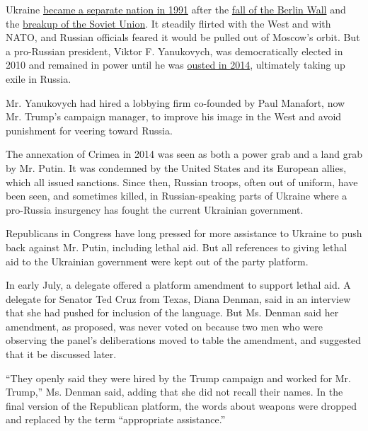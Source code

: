 Ukraine
\href{http://www.nytimes.com/1991/12/03/world/ex-communist-wins-in-ukraine-yeltsin-recognizes-independence.html}{became
a separate nation in 1991} after the
\href{http://www.nytimes.com/1989/11/10/world/clamor-east-east-germany-opens-frontier-west-for-migration-travel-thousands.html}{fall
of the Berlin Wall} and the
\href{http://www.nytimes.com/1991/12/24/world/end-of-the-soviet-union-yeltsin-asks-bush-to-grant-russians-recognition-by-us.html}{breakup
of the Soviet Union}. It steadily flirted with the West and with NATO,
and Russian officials feared it would be pulled out of Moscow's orbit.
But a pro-Russian president, Viktor F. Yanukovych, was democratically
elected in 2010 and remained in power until he was
\href{http://www.nytimes.com/2014/02/23/world/europe/with\%2Dpresidents\%2Ddeparture\%2Dukraine\%2Dlooks\%2Dtoward\%2Da\%2Dmurky\%2Dfuture.html}{ousted
in 2014}, ultimately taking up exile in Russia.

Mr. Yanukovych had hired a lobbying firm co-founded by Paul Manafort,
now Mr. Trump's campaign manager, to improve his image in the West and
avoid punishment for veering toward Russia.

The annexation of Crimea in 2014 was seen as both a power grab and a
land grab by Mr. Putin. It was condemned by the United States and its
European allies, which all issued sanctions. Since then, Russian troops,
often out of uniform, have been seen, and sometimes killed, in
Russian-speaking parts of Ukraine where a pro-Russia insurgency has
fought the current Ukrainian government.

Republicans in Congress have long pressed for more assistance to Ukraine
to push back against Mr. Putin, including lethal aid. But all references
to giving lethal aid to the Ukrainian government were kept out of the
party platform.

In early July, a delegate offered a platform amendment to support lethal
aid. A delegate for Senator Ted Cruz from Texas, Diana Denman, said in
an interview that she had pushed for inclusion of the language. But Ms.
Denman said her amendment, as proposed, was never voted on because two
men who were observing the panel's deliberations moved to table the
amendment, and suggested that it be discussed later.

``They openly said they were hired by the Trump campaign and worked for
Mr. Trump,'' Ms. Denman said, adding that she did not recall their
names. In the final version of the Republican platform, the words about
weapons were dropped and replaced by the term ``appropriate
assistance.''

